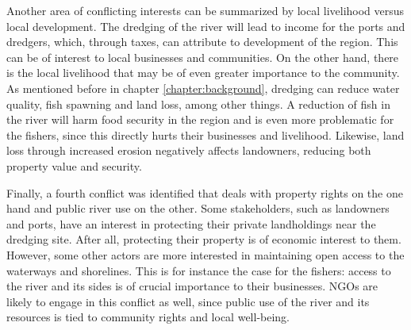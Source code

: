Another area of conflicting interests can be summarized by local livelihood versus local development. The dredging of the river will lead to income for the ports and dredgers, which, through taxes, can attribute to development of the region. This can be of interest to local businesses and communities. On the other hand, there is the local livelihood that may be of even greater importance to the community. As mentioned before in chapter \ref{chapter:background}, dredging can reduce water quality, fish spawning and land loss, among other things. A reduction of fish in the river will harm food security in the region and is even more problematic for the fishers, since this directly hurts their businesses and livelihood. Likewise, land loss through increased erosion negatively affects landowners, reducing both property value and security.

Finally, a fourth conflict was identified that deals with property rights on the one hand and public river use on the other. Some stakeholders, such as landowners and ports, have an interest in protecting their private landholdings near the dredging site. After all, protecting their property is of economic interest to them. However, some other actors are more interested in maintaining open access to the waterways and shorelines. This is for instance the case for the fishers: access to the river and its sides is of crucial importance to their businesses. NGOs are likely to engage in this conflict as well, since public use of the river and its resources is tied to community rights and local well-being.



